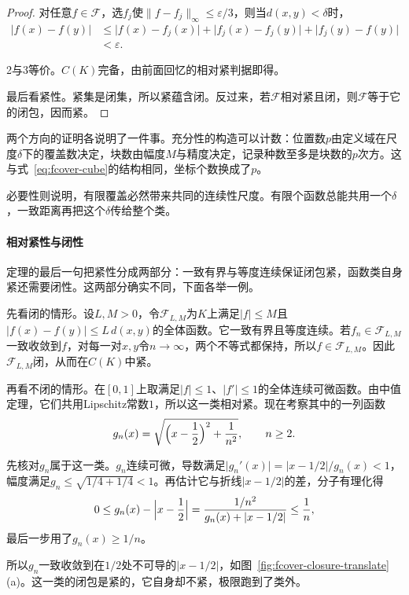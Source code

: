 \begin{proof}
对任意$f\in\mathcal F$，选$f_j$使$\lVert f-f_j\rVert_\infty\leq\varepsilon/3$，则当$d(x,y)<\delta$时，
\[
 \begin{aligned}
 \lvert f(x)-f(y)\rvert
 &\leq\lvert f(x)-f_j(x)\rvert+\lvert f_j(x)-f_j(y)\rvert+\lvert f_j(y)-f(y)\rvert\\
 &<\varepsilon .
 \end{aligned}
\]

2与3等价。$C(K)$完备，由前面回忆的相对紧判据即得。

最后看紧性。紧集是闭集，所以紧蕴含闭。反过来，若$\mathcal F$相对紧且闭，则$\mathcal F$等于它的闭包，因而紧。
\end{proof}

两个方向的证明各说明了一件事。充分性的构造可以计数：位置数$p$由定义域在尺度$\delta$下的覆盖数决定，块数由幅度$M$与精度决定，记录种数至多是块数的$p$次方。这与式~\eqref{eq:fcover-cube}的结构相同，坐标个数换成了$p$。

必要性则说明，有限覆盖必然带来共同的连续性尺度。有限个函数总能共用一个$\delta$，一致距离再把这个$\delta$传给整个类。

\paragraph{相对紧性与闭性}

定理的最后一句把紧性分成两部分：一致有界与等度连续保证闭包紧，函数类自身紧还需要闭性。这两部分确实不同，下面各举一例。

先看闭的情形。设$L,M>0$，令$\mathcal F_{L,M}$为$K$上满足$\lvert f\rvert\leq M$且$\lvert f(x)-f(y)\rvert\leq L\,d(x,y)$的全体函数。它一致有界且等度连续。若$f_n\in\mathcal F_{L,M}$一致收敛到$f$，对每一对$x,y$令$n\to\infty$，两个不等式都保持，所以$f\in\mathcal F_{L,M}$。因此$\mathcal F_{L,M}$闭，从而在$C(K)$中紧。

再看不闭的情形。在$[0,1]$上取满足$\lvert f\rvert\leq1$、$\lvert f'\rvert\leq1$的全体连续可微函数。由中值定理，它们共用Lipschitz常数$1$，所以这一类相对紧。现在考察其中的一列函数
\[
 g_n(x)=\sqrt{\Bigl(x-\frac12\Bigr)^2+\frac1{n^2}},\qquad n\geq2 .
\]

先核对$g_n$属于这一类。$g_n$连续可微，导数满足$\lvert g_n'(x)\rvert=\lvert x-1/2\rvert/g_n(x)<1$，幅度满足$g_n\leq\sqrt{1/4+1/4}<1$。再估计它与折线$\lvert x-1/2\rvert$的差，分子有理化得
\[
 0\leq g_n(x)-\Bigl\lvert x-\frac12\Bigr\rvert=\frac{1/n^2}{g_n(x)+\lvert x-1/2\rvert}\leq\frac1n,
\]
最后一步用了$g_n(x)\geq1/n$。

所以$g_n$一致收敛到在$1/2$处不可导的$\lvert x-1/2\rvert$，如图~\ref{fig:fcover-closure-translate}(a)。这一类的闭包是紧的，它自身却不紧，极限跑到了类外。

